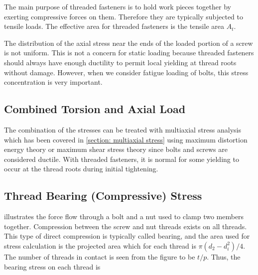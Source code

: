 \documentclass[
10pt,
a4paper,
openany,
svgnames,
]{book}
\begin{document}
The main purpose of threaded fasteners is to hold work pieces together by exerting compressive forces on them. Therefore they are typically subjected to tensile loads. The effective area for threaded fasteners is the tensile area $A_t$.

The distribution of the axial stress near the ends of the loaded portion of a screw is not uniform. This is not a concern for static loading because threaded fasteners should always have enough ductility to permit local yielding at thread roots without damage. However, when we consider fatigue loading of bolts, this stress concentration is very important.

\subsection{Combined Torsion and Axial Load}

The combination of the stresses can be treated with multiaxial stress analysis which has been covered in \cref{section: multiaxial stress} using maximum distortion energy theory or maximum shear stress theory since bolts and screws are considered ductile. With threaded fasteners, it is normal for some yielding to occur at the thread roots during initial tightening.

\subsection{Thread Bearing (Compressive) Stress}

 illustrates the force flow through a bolt and a nut used to clamp two members together. Compression between the screw and nut threads exists on all threads. This type of direct compression is typically called bearing, and the area used for stress calculation is the projected area which for each thread is $\pi(d_2 - d_i^2) / 4$. The number of threads in contact is seen from the figure to be $t/p$. Thus, the bearing stress on each thread is
\end{document}
